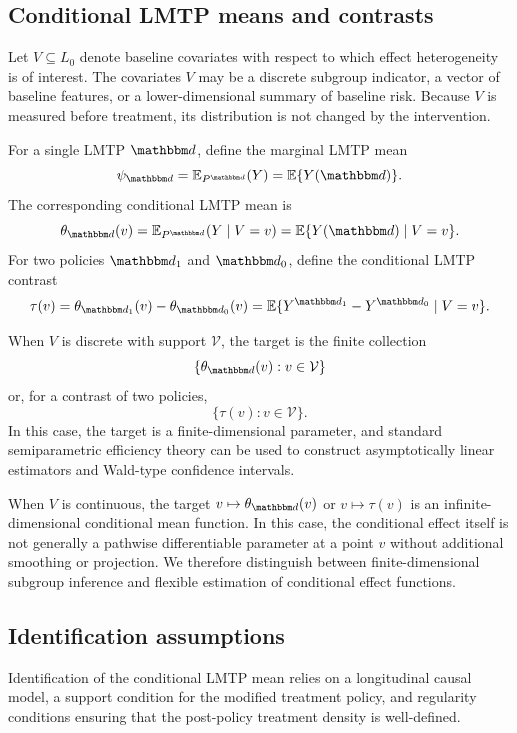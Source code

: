 \documentclass[11pt]{article}
\begin{document}
\subsection{Conditional LMTP means and contrasts}
\label{subsec:targets}

Let \(V\subseteq L_0\) denote baseline covariates with respect to which effect
heterogeneity is of interest. The covariates \(V\) may be a discrete subgroup
indicator, a vector of baseline features, or a lower-dimensional summary of
baseline risk. Because \(V\) is measured before treatment, its distribution is not
changed by the intervention.

For a single LMTP \(\mathbbm d\), define the marginal LMTP mean
\[
  \psi_{\mathbbm d}
  =
  \mathbb{E}_{P^{\mathbbm d}}(Y)
  =
  \mathbb{E}\{Y(\mathbbm d)\}.
\]
The corresponding conditional LMTP mean is
\[
  \theta_{\mathbbm d}(v)
  =
  \mathbb{E}_{P^{\mathbbm d}}(Y\mid V=v)
  =
  \mathbb{E}\{Y(\mathbbm d)\mid V=v\}.
\]
For two policies \(\mathbbm d_1\) and \(\mathbbm d_0\), define the conditional LMTP contrast
\[
  \tau(v)
  =
  \theta_{\mathbbm d_1}(v)
  -
  \theta_{\mathbbm d_0}(v) = 
  \E\{Y^{\mathbbm d_1} - Y^{\mathbbm d_0} \mid V = v\}.
\]

When \(V\) is discrete with support \(\mathcal V\), the target is the finite
collection
\[
  \{\theta_{\mathbbm d}(v):v\in\mathcal V\}
\]
or, for a contrast of two policies,
\[
  \{\tau(v):v\in\mathcal V\}.
\]
In this case, the target is a finite-dimensional parameter, and standard
semiparametric efficiency theory can be used to construct asymptotically linear
estimators and Wald-type confidence intervals.

When \(V\) is continuous, the target \(v\mapsto \theta_{\mathbbm d}(v)\) or
\(v\mapsto \tau(v)\) is an infinite-dimensional conditional mean function. In
this case, the conditional effect itself is not generally a pathwise
differentiable parameter at a point \(v\) without additional smoothing or
projection. We therefore distinguish between finite-dimensional subgroup
inference and flexible estimation of conditional effect functions.

\subsection{Identification assumptions}
\label{subsec:identification-assumptions}

Identification of the conditional LMTP mean relies on a longitudinal causal
model, a support condition for the modified treatment policy, and regularity
conditions ensuring that the post-policy treatment density is well-defined.
\end{document}
